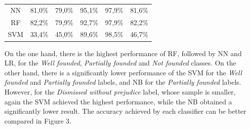 \begin{table}[htb]
\begin{tabular}{@{}crrrrr@{}}
NN                 & 81,0\%                                                                              & 79,0\%                                                                                & 95,1\%                                                                             & 97,9\%                                                                                               & 81,6\%                                                                                  \\\hdashline
RF                 & 82,2\%                                                                              & 79,9\%                                                                                & 92,7\%                                                                             & 97,9\%                                                                                               & 82,2\%                                                                                  \\\hdashline
SVM                & 33,4\%                                                                              & 45,0\%                                                                                & 89,6\%                                                                             & 98,5\%                                                                                               & 46,7\%                                                                                  \\ \bottomrule
\end{tabular}

\end{table}


On the one hand, there is the highest performance of RF, followed by NN and LR, for the \textit{Well founded}, \emph{Partially founded} and \emph{Not founded} classes. On the other hand, there is a significantly lower performance of the SVM for the \textit{Well founded} and \emph{Partially founded} labels, and NB for the  \emph{Partially founded} labels. However, for the \emph{Dismissed without prejudice} label, whose sample is smaller, again the SVM achieved the highest performance, while the NB obtained a significantly lower result. The accuracy achieved by each classifier can be better compared in Figure 3. 


